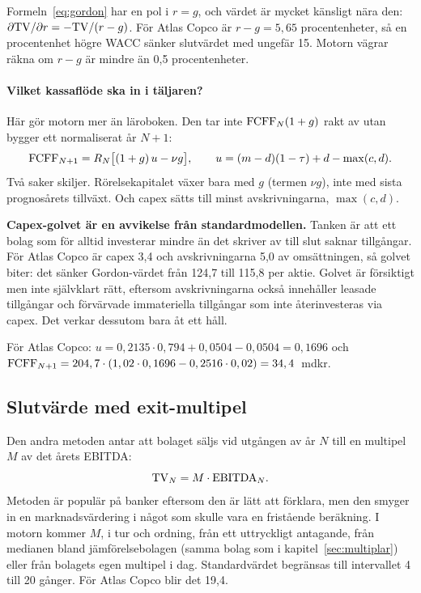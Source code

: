 \begin{komihag}
Formeln~\eqref{eq:gordon} har en pol i $r = g$, och värdet är mycket känsligt nära den:
$\partial \mathrm{TV} / \partial r = -\mathrm{TV}/(r-g)$. För Atlas Copco är $r - g = 5,65$ procentenheter, så
en procentenhet högre WACC sänker slutvärdet med ungefär 15\pct. Motorn vägrar räkna om
$r - g$ är mindre än 0,5 procentenheter.
\end{komihag}

\paragraph{Vilket kassaflöde ska in i täljaren?} Här gör motorn mer än läroboken. Den tar inte
$\mathrm{FCFF}_N (1+g)$ rakt av utan bygger ett normaliserat år $N+1$:
\begin{equation}
  \mathrm{FCFF}_{N+1} = R_N \bigl[(1+g)\,u - \nu g\bigr],
  \qquad u = (m-d)(1-\tau) + d - \max(c, d).
  \label{eq:terminal-fcff}
\end{equation}
Två saker skiljer. Rörelsekapitalet växer bara med $g$ (termen $\nu g$), inte med sista
prognosårets tillväxt. Och capex sätts till minst avskrivningarna, $\max(c, d)$.

\begin{imotorn}
\textbf{Capex-golvet är en avvikelse från standardmodellen.} Tanken är att ett bolag som för
alltid investerar mindre än det skriver av till slut saknar tillgångar. För Atlas Copco är
capex 3,4\pct{} och avskrivningarna 5,0\pct{} av omsättningen, så golvet biter: det sänker
Gordon-värdet från 124,7 till 115,8\kr{} per aktie. Golvet är försiktigt men inte självklart
rätt, eftersom avskrivningarna också innehåller leasade tillgångar och förvärvade immateriella
tillgångar som inte återinvesteras via capex. Det verkar dessutom bara åt ett håll.
\end{imotorn}

För Atlas Copco: $u = 0,2135 \cdot 0,794 + 0,0504 - 0,0504 = 0,1696$ och
$\mathrm{FCFF}_{N+1} = 204,7 \cdot (1,02 \cdot 0,1696 - 0,2516 \cdot 0,02) = 34,4$~mdkr.

\subsection{Slutvärde med exit-multipel}

Den andra metoden antar att bolaget säljs vid utgången av år $N$ till en multipel $M$ av det
årets EBITDA:
\begin{equation}
  \mathrm{TV}_N = M \cdot \mathrm{EBITDA}_N .
  \label{eq:exit}
\end{equation}
Metoden är populär på banker eftersom den är lätt att förklara, men den smyger in en
marknadsvärdering i något som skulle vara en fristående beräkning. I motorn kommer $M$, i
tur och ordning, från ett uttryckligt antagande, från medianen bland jämförelsebolagen (samma
bolag som i kapitel~\ref{sec:multiplar}) eller från bolagets egen multipel i dag. Standardvärdet
begränsas till intervallet 4 till 20 gånger. För Atlas Copco blir det 19,4.

